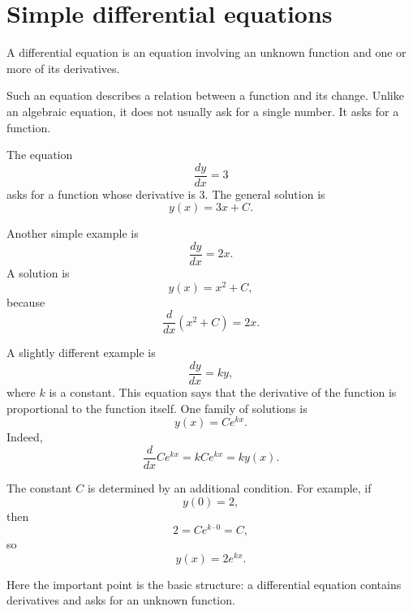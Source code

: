 \section{Simple differential equations}

\begin{definitionbox}
A differential equation is an equation involving an unknown function and one or more of its derivatives.
\end{definitionbox}

Such an equation describes a relation between a function and its change. Unlike an algebraic equation, it does not usually ask for a single number. It asks for a function.

The equation
\[
\frac{dy}{dx}=3
\]
asks for a function whose derivative is \(3\). The general solution is
\[
y(x)=3x+C.
\]

Another simple example is
\[
\frac{dy}{dx}=2x.
\]
A solution is
\[
y(x)=x^2+C,
\]
because
\[
\frac{d}{dx}(x^2+C)=2x.
\]

A slightly different example is
\[
\frac{dy}{dx}=ky,
\]
where \(k\) is a constant. This equation says that the derivative of the function is proportional to the function itself. One family of solutions is
\[
y(x)=Ce^{kx}.
\]
Indeed,
\[
\frac{d}{dx}Ce^{kx}=kCe^{kx}=ky(x).
\]

The constant \(C\) is determined by an additional condition. For example, if
\[
y(0)=2,
\]
then
\[
2=Ce^{k\cdot 0}=C,
\]
so
\[
y(x)=2e^{kx}.
\]

\begin{remarkbox}
Here the important point is the basic structure: a differential equation contains derivatives and asks for an unknown function.
\end{remarkbox}
